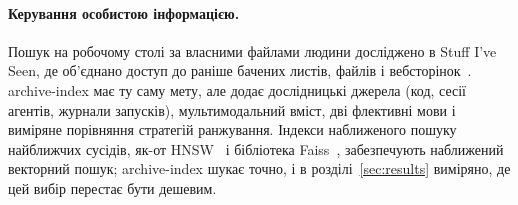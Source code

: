 \paragraph{Керування особистою інформацією.}
Пошук на робочому столі за власними файлами людини досліджено в Stuff I've Seen, де об'єднано доступ до раніше бачених листів, файлів і вебсторінок~\citep{dumais2003sis}. archive-index має ту саму мету, але додає дослідницькі джерела (код, сесії агентів, журнали запусків), мультимодальний вміст, дві флективні мови і виміряне порівняння стратегій ранжування. Індекси наближеного пошуку найближчих сусідів, як-от HNSW~\citep{malkov2020hnsw} і бібліотека Faiss~\citep{douze2024faiss}, забезпечують наближений векторний пошук; archive-index шукає точно, і в розділі~\ref{sec:results} виміряно, де цей вибір перестає бути дешевим.
